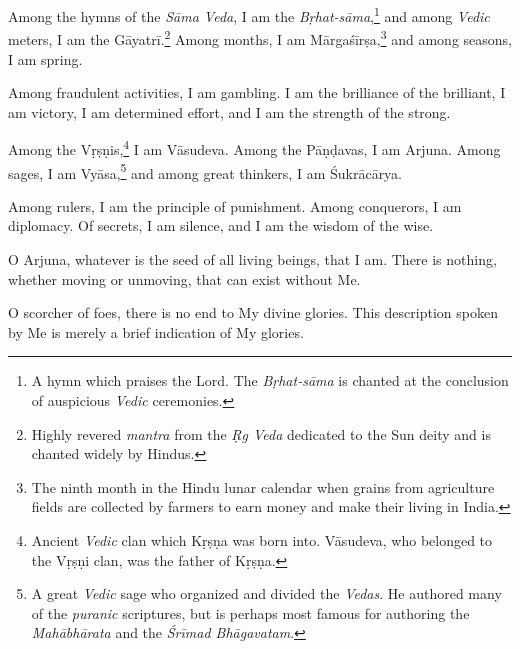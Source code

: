{Among the hymns of the \textit{Sāma Veda}, I am the \textit{Bṛhat-sāma},\footnote{A hymn which praises the Lord. The \textit{Bṛhat-sāma} is chanted at the conclusion of auspicious \textit{Vedic} ceremonies.} and among \textit{Vedic} meters, I am the Gāyatrī.\footnote{Highly revered \textit{mantra} from the \textit{Ṛg Veda} dedicated to the Sun deity and is chanted widely by Hindus.} Among months, I am Mārgaśīrṣa,\footnote{The ninth month in the Hindu lunar calendar when grains from agriculture fields are collected by farmers to earn money and make their living in India.} and among seasons, I am spring.}

{Among fraudulent activities, I am gambling. I am the brilliance of the brilliant, I am victory, I am determined effort, and I am the strength of the strong.}

{Among the Vṛṣṇis,\footnote{Ancient \textit{Vedic} clan which Kṛṣṇa was born into. Vāsudeva, who belonged to the Vṛṣṇi clan, was the father of Kṛṣṇa.} I am Vāsudeva. Among the Pāṇḍavas, I am Arjuna. Among sages, I am Vyāsa,\footnote{A great \textit{Vedic} sage who organized and divided the \textit{Vedas}. He authored many of the \textit{puranic} scriptures, but is perhaps most famous for authoring the \textit{Mahābhārata} and the \textit{Śrīmad Bhāgavatam}.} and among great thinkers, I am Śukrācārya.}

{Among rulers, I am the principle of punishment. Among conquerors, I am diplomacy. Of secrets, I am silence, and I am the wisdom of the wise.}

{O Arjuna, whatever is the seed of all living beings, that I am. There is nothing, whether moving or unmoving, that can exist without Me.}

{O scorcher of foes, there is no end to My divine glories. This description spoken by Me is merely a brief indication of My glories.}

